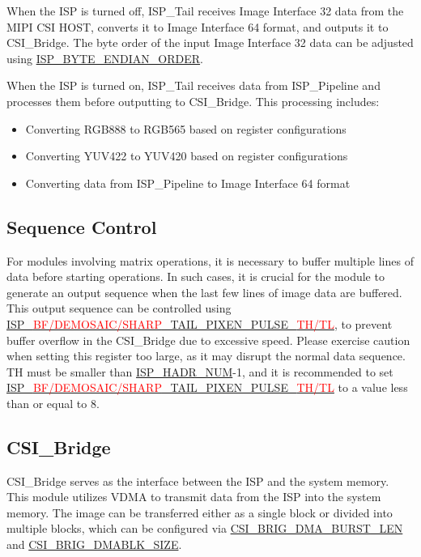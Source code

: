 \documentclass[main\_\_EN.tex]{subfiles}
\begin{document}
When the ISP is turned off, ISP\_Tail receives Image Interface 32 data from the MIPI CSI HOST, converts it to Image Interface 64 format, and outputs it to CSI\_Bridge. The byte order of the input Image Interface 32 data can be adjusted using \hyperref[fielddesc:ISPBYTEENDIANORDER]{ISP\_BYTE\_ENDIAN\_ORDER}.

When the ISP is turned on, ISP\_Tail receives data from ISP\_Pipeline and processes them before outputting to CSI\_Bridge. This processing includes:
\begin{itemize}
    \item Converting RGB888 to RGB565 based on register configurations
    \item Converting YUV422 to YUV420 based on register configurations
    \item Converting data from ISP\_Pipeline to Image Interface 64 format
\end{itemize}


\subsection{Sequence Control}

For modules involving matrix operations, it is necessary to buffer multiple lines of data before starting operations. In such cases, it is crucial for the module to generate an output sequence when the last few lines of image data are buffered. This output sequence can be controlled using \hyperref[fielddesc:ISPBFTAILPIXENPULSETH]{ISP\_\textcolor{red}{BF/DEMOSAIC/SHARP}\_TAIL\_PIXEN\_PULSE\_\textcolor{red}{TH/TL}}, to prevent buffer overflow in the CSI\_Bridge due to excessive speed. Please exercise caution when setting this register too large, as it may disrupt the normal data sequence. TH must be smaller than \hyperref[fielddesc:ISPHADRNUM]{ISP\_HADR\_NUM}-1, and it is recommended to set \hyperref[fielddesc:ISPBFTAILPIXENPULSETH]{ISP\_\textcolor{red}{BF/DEMOSAIC/SHARP}\_TAIL\_PIXEN\_PULSE\_\textcolor{red}{TH/TL}} to a value less than or equal to 8.


\subsection{CSI\_Bridge}

CSI\_Bridge serves as the interface between the ISP and the system memory. This module utilizes VDMA to transmit data from the ISP into the system memory. The image can be transferred either as a single block or divided into multiple blocks, which can be configured via \hyperref[fielddesc:CSIBRIGDMABURSTLEN]{CSI\_BRIG\_DMA\_BURST\_LEN} and \hyperref[fielddesc:CSIBRIGDMABLKSIZE]{CSI\_BRIG\_DMABLK\_SIZE}.
\end{document}
